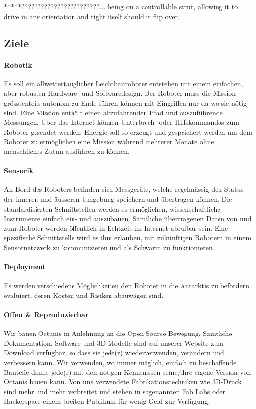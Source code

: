 \documentclass[a4paper,12pt]{article}
\begin{document}
*****????????????????????????... being on a controllable strut, allowing it to drive in any orientation and right itself should it flip over. 


\subsection{Ziele}

\paragraph{Robotik}
Es soll ein allwettertauglicher Leichtbauroboter entstehen mit einem einfachen, aber robusten Hardware- und Softwaredesign. Der Roboter muss die Mission grösstenteils autonom zu Ende führen können mit Eingriffen nur da wo sie nötig sind. Eine Mission enthält einen abzufahrenden Pfad und auszuführende Messungen. Über das Internet können Unterbrech- oder Hilfskommandos zum Roboter gesendet werden. Energie soll so erzeugt und gespeichert werden um dem Roboter zu ermöglichen eine Mission während mehrerer Monate ohne menschliches Zutun ausführen zu können.

\paragraph{Sensorik}
An Bord des Roboters befinden sich Messgeräte, welche regelmässig den Status der inneren und äusseren Umgebung speichern und übertragen können. Die standardisierten Schnittstellen werden es ermöglichen, wissenschaftliche Instrumente einfach ein- und auszubauen. Sämtliche übertragenen Daten von und zum Roboter werden öffentlich in Echtzeit im Internet abrufbar sein. Eine spezifische Schnittstelle wird es ihm erlauben, mit zukünftigen Robotern in einem Sensornetzwerk zu kommunizieren und als Schwarm zu funktionieren.

\paragraph{Deployment}
Es werden verschiedene Möglichkeiten den Roboter in die Antarktis zu befördern evaluiert, deren Kosten und Risiken abzuwägen sind.



\paragraph{Offen \& Reproduzierbar} 
Wir bauen Octanis in Anlehnung an die Open Source Bewegung. Sämtliche Dokumentation, Software und 3D-Modelle sind auf unserer Website zum Download verfügbar, so dass sie jede(r) wiederverwenden, verändern und verbessern kann. Wir verwenden, wo immer möglich, einfach zu beschaffende Bauteile damit jede(r) mit den nötigen Kenntnissen seine/ihre eigene Version von Octanis bauen kann. Von uns verwendete Fabrikationstechniken wie 3D-Druck sind mehr und mehr verbreitet und stehen in sogenannten Fab Labs \cite{fablab} oder Hackerspace \cite{hackerspace} einem breiten Publikum für wenig Geld zur Verfügung.
 
\end{document}
